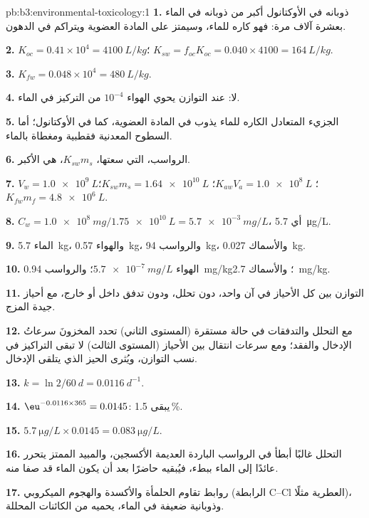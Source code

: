 \begin{solution}{pb:b3:environmental-toxicology:1}
\textbf{1.} ذوبانه في الأوكتانول أكبر من ذوبانه في الماء بعشرة آلاف مرة: فهو كاره للماء،
وسيمتز على المادة العضوية ويتراكم في الدهون.

\textbf{2.} $K_{oc} = 0.41 \times 10^4 = \qty{4100}{L/kg}$؛ $K_{sw} = f_{oc}K_{oc} = 0.040 \times 4100 = \qty{164}{L/kg}$.

\textbf{3.} $K_{fw} = 0.048 \times 10^4 = \qty{480}{L/kg}$.

\textbf{4.} لا: عند التوازن يحوي الهواء $10^{-4}$ من التركيز في الماء.

\textbf{5.} الجزيء المتعادل الكاره للماء يذوب في المادة العضوية، كما في
الأوكتانول؛ أما السطوح المعدنية فقطبية ومغطاة بالماء.

\textbf{6.} الرواسب، التي سعتها، $K_{sw}m_s$، هي الأكبر.

\textbf{7.} $V_w = \qty{1.0e9}{L}$؛ $K_{aw}V_a = \qty{1.0e8}{L}$؛ $K_{sw}m_s = \qty{1.64e10}{L}$؛ $K_{fw}m_f = \qty{4.8e6}{L}$.

\textbf{8.} $C_w = \qty{1.0e8}{mg}/\qty{1.75e10}{L} = \qty{5.7e-3}{mg/L}$، أي \qty{5.7}{\micro g/L}.

\textbf{9.} الماء \qty{5.7}{kg}، والهواء \qty{0.57}{kg}، والرواسب \qty{94}{kg}، والأسماك \qty{0.027}{kg}.

\textbf{10.} الهواء $\qty{5.7e-7}{mg/L}$؛ والرواسب \qty{0.94}{mg/kg}؛ والأسماك \qty{2.7}{mg/kg}.

\textbf{11.} التوازن بين كل الأحياز في آن واحد، دون تحلل، ودون
تدفق داخل أو خارج، مع أحياز جيدة المزج.

\textbf{12.} مع التحلل والتدفقات في حالة مستقرة (المستوى الثاني) تحدد المخزونَ
سرعاتُ الإدخال والفقد؛ ومع سرعات انتقال بين الأحياز (المستوى الثالث)
لا تبقى التراكيز في نسب التوازن، ويُثرى الحيز الذي
يتلقى الإدخال.

\textbf{13.} $k = \ln 2/\qty{60}{d} = \qty{0.0116}{d^{-1}}$.

\textbf{14.} $\eu^{-0.0116 \times 365} = 0.0145$: يبقى 1.5\,\%.

\textbf{15.} $\qty{5.7}{\micro g/L} \times 0.0145 = \qty{0.083}{\micro g/L}$.

\textbf{16.} التحلل غالبًا أبطأ في الرواسب الباردة العديمة الأكسجين، والمبيد الممتز
يتحرر عائدًا إلى الماء ببطء، فيُبقيه حاضرًا بعد أن يكون
الماء قد صفا منه.

\textbf{17.} روابط تقاوم الحلمأة والأكسدة والهجوم الميكروبي (الرابطة C--Cl
العطرية مثلًا)، وذوبانية ضعيفة في الماء،  يحميه من
الكائنات المحللة.


\end{solution}
